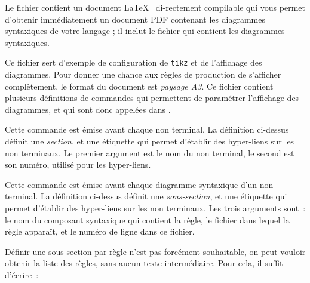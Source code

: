 
Le fichier  contient un document \LaTeX~ di-rectement compilable qui vous permet d'obtenir immédiatement un document PDF contenant les diagrammes syntaxiques de votre langage ; il inclut le fichier   qui contient les diagrammes syntaxiques.

Ce fichier sert d'exemple de configuration de \texttt{tikz} et de l'affichage des diagrammes. Pour donner une chance aux règles de production de s'afficher complètement, le format du document est \emph{paysage A3}. Ce fichier contient plusieurs définitions de commandes qui permettent de paramétrer l'affichage des diagrammes, et qui sont donc appelées dans .





Cette commande est émise avant chaque non terminal. La définition ci-dessus définit une \emph{section}, et une étiquette qui permet d'établir des hyper-liens sur les non terminaux. Le premier argument est le nom du non terminal, le second est son numéro, utilisé pour les hyper-liens.




Cette commande est émise avant chaque diagramme syntaxique d'un non terminal. La définition ci-dessus définit une \emph{sous-section}, et une étiquette qui permet d'établir des hyper-liens sur les non terminaux. Les trois arguments sont~: le nom du composant syntaxique qui contient la règle, le fichier dans lequel  la règle apparaît, et le numéro de ligne dans ce fichier.

Définir une sous-section par règle n'est pas forcément souhaitable, on peut vouloir obtenir la liste des règles, sans aucun texte intermédiaire. Pour cela, il suffit d'écrire~:

